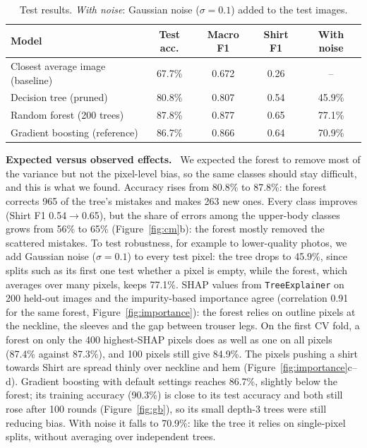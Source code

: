 \documentclass[11pt,a4paper]{article}
\newcommand{\pkg}[1]{\texttt{#1}}
\newcommand{\para}[1]{\textbf{#1}\ }
\begin{document}
\begin{table}[h]
\centering
\small
\begin{tabular}{lcccc}
\toprule
Model & Test acc. & Macro F1 & Shirt F1 & With noise \\
\midrule
Closest average image (baseline) & 67.7\% & 0.672 & 0.26 & -- \\
Decision tree (pruned)           & 80.8\% & 0.807 & 0.54 & 45.9\% \\
Random forest (200 trees)        & 87.8\% & 0.877 & 0.65 & 77.1\% \\
Gradient boosting (reference)    & 86.7\% & 0.866 & 0.64 & 70.9\% \\
\bottomrule
\end{tabular}
\caption{Test results. \emph{With noise}: Gaussian noise ($\sigma=0.1$) added to the test images.}
\label{tab:results}
\end{table}

\para{Expected versus observed effects.} We expected the forest to remove most of the variance but not the pixel-level bias, so the same classes should stay difficult, and this is what we found. Accuracy rises from 80.8\% to 87.8\%: the forest corrects 965 of the tree's mistakes and makes 263 new ones. Every class improves (Shirt F1 0.54$\to$0.65), but the share of errors among the upper-body classes grows from 56\% to 65\% (Figure~\ref{fig:cm}b): the forest mostly removed the scattered mistakes. To test robustness, for example to lower-quality photos, we add Gaussian noise ($\sigma=0.1$) to every test pixel: the tree drops to 45.9\%, since splits such as its first one test whether a pixel is empty, while the forest, which averages over many pixels, keeps 77.1\%. SHAP values from \pkg{TreeExplainer} on 200 held-out images and the impurity-based importance agree (correlation 0.91 for the same forest, Figure~\ref{fig:importance}): the forest relies on outline pixels at the neckline, the sleeves and the gap between trouser legs. On the first CV fold, a forest on only the 400 highest-SHAP pixels does as well as one on all pixels (87.4\% against 87.3\%), and 100 pixels still give 84.9\%. The pixels pushing a shirt towards Shirt are spread thinly over neckline and hem (Figure~\ref{fig:importance}c--d). Gradient boosting with default settings reaches 86.7\%, slightly below the forest; its training accuracy (90.3\%) is close to its test accuracy and both still rose after 100 rounds (Figure~\ref{fig:gb}), so its small depth-3 trees were still reducing bias. With noise it falls to 70.9\%: like the tree it relies on single-pixel splits, without averaging over independent trees.
\end{document}
